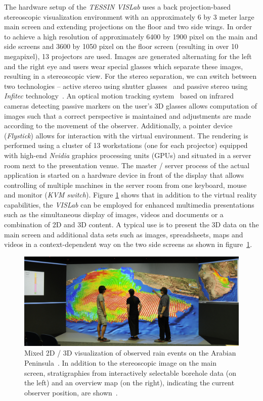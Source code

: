 \documentclass[twocolumn]{svjour3}          %
\begin{document}
The hardware setup of the \emph{TESSIN VISLab} uses a back projection-based stereoscopic visualization environment with an approximately 6 by 3 meter large main screen and extending projections on the floor and two side wings. In order to achieve a high resolution of approximately 6400 by 1900 pixel on the main and side screens and 3600 by 1050 pixel on the floor screen (resulting in over 10 megapixel), 13 projectors are used. Images are generated alternating for the left and the right eye and users wear special glasses which separate these images, resulting in a stereoscopic view. For the stereo separation, we can switch between two technologies -- active stereo using shutter glasses~\cite{activestereo} and passive stereo using \emph{Infitec} technology~\cite{infitec}. An optical motion tracking system~\cite{tracking} based on infrared cameras detecting passive markers on the user's 3D glasses allows computation of images such that a correct perspective is maintained and adjustments are made according to the movement of the observer. Additionally, a pointer device (\emph{Flystick}) allows for interaction with the virtual environment. The rendering is performed using a cluster of 13 workstations (one for each projector) equipped with high-end \emph{Nvidia} graphics processing units (GPUs) and situated in a server room next to the presentation venue. The master / server process of the actual application is started on a hardware device in front of the display that allows controlling of multiple machines in the server room from one keyboard, mouse and monitor (\emph{KVM switch}). Figure \ref{fig:sa}  shows that in addition to the virtual reality capabilities, the \emph{VISLab} can be employed for enhanced multimedia presentations such as the simultaneous display of images, videos and documents or a combination of 2D and 3D content. A typical use is to present the 3D data on the main screen and additional data sets such as images, spreadsheets, maps and videos in a context-dependent way on the two side screens as shown in figure~\ref{fig:sa}.

\begin{figure}
  \includegraphics[width=1.0\textwidth]{images/sa_2d_3d.jpg}
\caption{Mixed 2D / 3D visualization of observed rain events on the Arabian Peninsula~\cite{rink:iwas}. In addition to the stereoscopic image on the main screen, stratigraphies from interactively selectable borehole data (on the left) and an overview map (on the right), indicating the current observer position, are shown~\cite{zehner:2d3d}.}
\label{fig:sa}
\end{figure}
\end{document}
